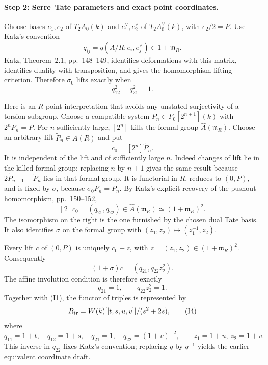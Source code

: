 \paragraph{Step 2: Serre--Tate parameters and exact point coordinates.}
Choose bases $e_1,e_2$ of $T_2A_0(k)$ and $e_1^\vee,e_2^\vee$ of
$T_2A_0^\vee(k)$, with $e_2/2=P$. Use Katz's convention
\[
 q_{ij}=q(A/R;e_i,e_j^\vee)\in1+\mathfrak m_R.
\]
Katz, Theorem~2.1, pp.~148--149, identifies deformations with this matrix,
identifies duality with transposition, and gives the homomorphism-lifting
criterion. Therefore $\sigma_0$ lifts exactly when
\[
 q_{12}^2=q_{21}^2=1.                                      \tag{I1}
\]

Here is an $R$-point interpretation that avoids any unstated surjectivity
of a torsion subgroup. Choose a compatible system
$P_n\in F_0[2^{n+1}](k)$ with $2^nP_n=P$. For $n$ sufficiently large,
$[2^n]$ kills the formal group $\widehat A(\mathfrak m_R)$.
Choose an arbitrary lift $\widetilde P_n\in A(R)$ and put
\[
 c_0=[2^n]\widetilde P_n.
\]
It is independent of the lift and of sufficiently large $n$.
Indeed changes of lift lie in the killed formal group; replacing
$n$ by $n+1$ gives the same result because
$2\widetilde P_{n+1}-\widetilde P_n$ lies in that formal group.
It is functorial in $R$, reduces to $(0,P)$, and is fixed by $\sigma$,
because $\sigma_0P_n=P_n$. By Katz's explicit recovery of the
pushout homomorphism, pp.~150--152,
\[
 [2]c_0=(q_{21},q_{22})\in
 \widehat A(\mathfrak m_R)\simeq(1+\mathfrak m_R)^2.        \tag{I2}
\]
The isomorphism on the right is the one furnished by the chosen dual
Tate basis. It also identifies $\sigma$ on the formal group with
$(z_1,z_2)\mapsto(z_1^{-1},z_2)$.

Every lift $c$ of $(0,P)$ is uniquely $c_0+z$, with
$z=(z_1,z_2)\in(1+\mathfrak m_R)^2$. Consequently
\[
 (1+\sigma)c=(q_{21},q_{22}z_2^2).
\]
The affine involution condition is therefore exactly
\[
 q_{21}=1,\qquad q_{22}z_2^2=1.                           \tag{I3}
\]
Together with (I1), the functor of triples is represented by
\[
 R_{\rm tr}=W(k)[[t,s,u,v]]/(s^2+2s),                     \tag{I4}
\]
where
\[
 q_{11}=1+t,\quad q_{12}=1+s,\quad q_{21}=1,\quad
 q_{22}=(1+v)^{-2},\qquad z_1=1+u,\ z_2=1+v.
\]
This inverse in $q_{22}$ fixes Katz's convention; replacing $q$ by
$q^{-1}$ yields the earlier equivalent coordinate draft.

